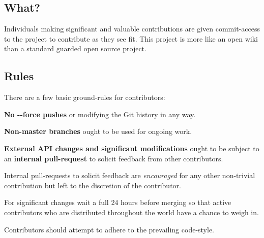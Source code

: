 



\subsection*{What?}

Individuals making significant and valuable contributions are given commit-\/access to the project to contribute as they see fit. This project is more like an open wiki than a standard guarded open source project.

\subsection*{Rules}

There are a few basic ground-\/rules for contributors\+:


\begin{DoxyEnumerate}
\item {\bfseries No {\ttfamily -\/-\/force} pushes} or modifying the Git history in any way.
\end{DoxyEnumerate}
\begin{DoxyEnumerate}
\item {\bfseries Non-\/master branches} ought to be used for ongoing work.
\end{DoxyEnumerate}
\begin{DoxyEnumerate}
\item {\bfseries External A\+P\+I changes and significant modifications} ought to be subject to an {\bfseries internal pull-\/request} to solicit feedback from other contributors.
\end{DoxyEnumerate}
\begin{DoxyEnumerate}
\item Internal pull-\/requests to solicit feedback are {\itshape encouraged} for any other non-\/trivial contribution but left to the discretion of the contributor.
\end{DoxyEnumerate}
\begin{DoxyEnumerate}
\item For significant changes wait a full 24 hours before merging so that active contributors who are distributed throughout the world have a chance to weigh in.
\end{DoxyEnumerate}
\begin{DoxyEnumerate}
\item Contributors should attempt to adhere to the prevailing code-\/style.
\end{DoxyEnumerate}


